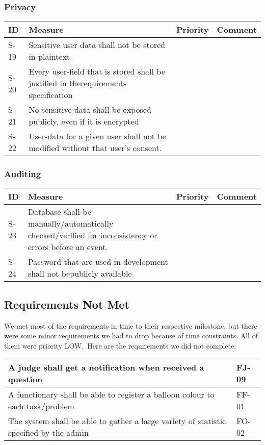 \newpage
\subsubsection{Privacy}
\begin{supertabular}{|l|p{7cm}|l|p{5cm}|}
\hline
\textbf{ID} & \textbf{Measure} & \textbf{Priority} & \textbf{Comment} \\ 
\hline

S-19 & Sensitive user data shall not be stored in plaintext  & & \\ 
\hline

S-20 & Every user-field that is stored shall be justified in therequirements
specification & & \\ 
\hline

S-21 & No sensitive data shall be exposed publicly, even if it is encrypted& &
\\ 
\hline

S-22 & User-data for a given user shall not be modified without that user's
consent.  & & \\ 
\hline
\end{supertabular}

\subsubsection{Auditing}
\begin{supertabular}{|l|p{7cm}|l|p{5cm}|}
\hline
\textbf{ID} & \textbf{Measure} & \textbf{Priority} & \textbf{Comment} \\ 
\hline

S-23 & Database shall be manually/automatically checked/verified for
inconsistency or errors before an event. & & \\
\hline

S-24 & Password that are used in development shall not bepublicly available
& &\\
\hline
\end{supertabular}

\subsection{Requirements Not Met}
We met most of the requirements in time to their respective milestone,
but there were some minor requirements we had to drop because of time
constraints. All of them were priority LOW.\ Here are the requirements
we did not complete:

\begin{supertabular}{|m{5.0566597in}|m{1.2858598in}|}
\hline
A judge shall get a notification when received a
question &
FJ-09\\\hline
A functionary shall be able to register a balloon
colour to each task/problem &
FF-01\\\hline
The system shall be able to gather a large
variety of statistic specified by the admin &
FO-02\\\hline
\end{supertabular}

